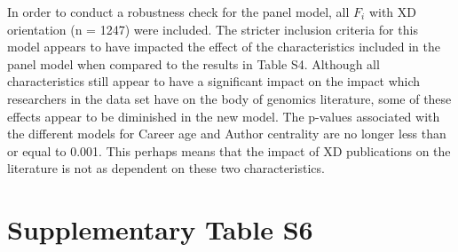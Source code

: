 \documentclass[10pt]{article}          %
\begin{document}
In order to conduct a robustness check for the panel model, all $F_i$  with XD orientation (n = 1247) were included. The stricter inclusion criteria for this model appears to have impacted the effect of the characteristics included in the panel model when compared to the results in Table S4. Although all characteristics still appear to have a significant impact on the impact which researchers in the data set have on the body of genomics literature, some of these effects appear to be diminished in the new model. The p-values associated with the different models for Career age and Author centrality are no longer less than or equal to 0.001. This perhaps means that the impact of XD publications on the literature is not as dependent on these two characteristics. 

\newpage
\section{Supplementary Table S6}
\end{document}
